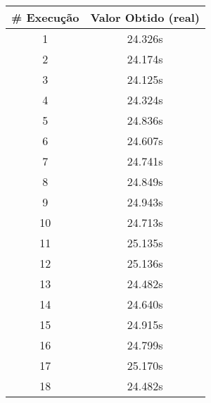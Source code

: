 \documentclass[11pt]{article}
\begin{document}
\begin{table}[!h]
\begin{center}
\begin{minipage}{0.48\textwidth}
\begin{tabular}{| c | c |}
			\hline
				\textbf{\# Execução} &  \textbf{Valor Obtido (real)} \\ \hline
				1 & 24.326s \\ \hline
				2 & 24.174s \\ \hline
				3 & 24.125s \\ \hline
				4 & 24.324s \\ \hline
				5 & 24.836s \\ \hline
				6 & 24.607s \\ \hline
				7 & 24.741s \\ \hline
				8 & 24.849s \\ \hline
				9 & 24.943s \\ \hline
				10 & 24.713s \\ \hline
				11 & 25.135s \\ \hline
				12 & 25.136s \\ \hline
				13 & 24.482s \\ \hline
				14 & 24.640s \\ \hline
				15 & 24.915s \\ \hline
				16 & 24.799s \\ \hline
				17 & 25.170s \\ \hline
				18 & 24.482s \\ \hline
			\end{tabular}
		\end{minipage}
	\end{center}
\end{table}
\end{document}
